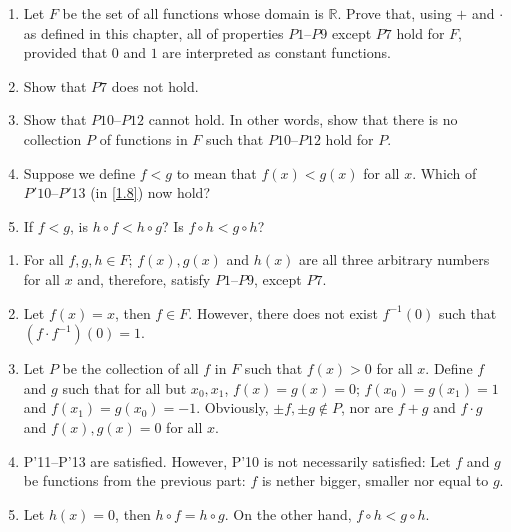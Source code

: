 \begin{pr} \label{3.28}
  \begin{enumerate}[label = (\alph*)]
    \item Let $F$ be the set of all functions whose domain is $\mathbb{R}$. Prove
    that, using $+$ and $\cdot$ as defined in this chapter, all of properties
    $P1$--$P9$ except $P7$ hold for $F$, provided that $0$ and $1$ are interpreted
    as constant functions.
    \item Show that $P7$ does not hold.
    \item Show that $P10$--$P12$ cannot hold. In other words, show that there is no
    collection $P$ of functions in $F$ such that $P10$--$P12$ hold for $P$.
    \item Suppose we define $f < g$ to mean that $f(x) < g(x)$ for all $x$. Which of
    $P'10$--$P'13$ (in \ref{1.8}) now hold?
    \item If $f < g$, is $h \circ f < h \circ g$? Is $f \circ h < g \circ h$?
  \end{enumerate}
\end{pr}

\begin{solution}
  \begin{enumerate}[label = (\alph*)]
    \item For all $f, g, h \in F$; $f(x),g(x)$ and $h(x)$ are all three arbitrary
    numbers for all $x$ and, therefore, satisfy $P1$--$P9$, except $P7$.
    \item Let $f(x) = x$, then $f \in F$. However, there does not exist
    $f^{-1}(0)$ such that $(f \cdot f^{-1})(0) = 1$.
    \item Let $P$ be the collection of all $f$ in $F$ such that $f(x) > 0$ for
    all $x$. Define $f$ and $g$ such that for all but $x_0,x_1$, $f(x) = g(x) = 0$;
    $f(x_0) = g(x_1) = 1$ and $f(x_1) = g(x_0) = -1$. Obviously, $\pm f,\pm g \notin P$,
    nor are $f + g$ and $f \cdot g$ and $f(x),g(x) = 0$ for all $x$.
    \item P'11--P'13 are satisfied. However, P'10 is not necessarily satisfied:
    Let $f$ and $g$ be functions from the previous part: $f$ is nether bigger, smaller
    nor equal to $g$.
    \item Let $h(x) = 0$, then $h \circ f = h \circ g$. On the other hand,
    $f \circ h < g \circ h$.
  \end{enumerate}
\end{solution}
